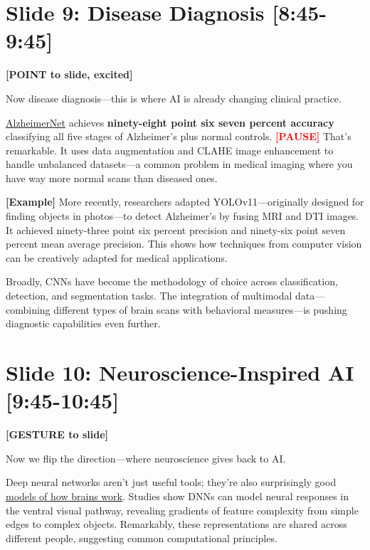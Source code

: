 \documentclass[12pt]{article}
\begin{document}
\hrulefill

\section*{Slide 9: Disease Diagnosis [8:45-9:45]}

\textcolor{DukeBlue}{\textbf{[POINT to slide, excited]}}

Now disease diagnosis—this is where AI is already changing clinical practice.

\ul{AlzheimerNet} achieves \textcolor{DukeBlue}{\textbf{ninety-eight point six seven percent accuracy}} classifying all five stages of Alzheimer's plus normal controls. \textcolor{red}{\textbf{[PAUSE]}} That's remarkable. It uses data augmentation and CLAHE image enhancement to handle unbalanced datasets—a common problem in medical imaging where you have way more normal scans than diseased ones.

\textcolor{green!60!black}{\textbf{[Example]}} More recently, researchers adapted YOLOv11—originally designed for finding objects in photos—to detect Alzheimer's by fusing MRI and DTI images. It achieved ninety-three point six percent precision and ninety-six point seven percent mean average precision. This shows how techniques from computer vision can be creatively adapted for medical applications.

Broadly, CNNs have become the methodology of choice across classification, detection, and segmentation tasks. The integration of multimodal data—combining different types of brain scans with behavioral measures—is pushing diagnostic capabilities even further.

\hrulefill

\section*{Slide 10: Neuroscience-Inspired AI [9:45-10:45]}

\textcolor{DukeBlue}{\textbf{[GESTURE to slide]}}

Now we flip the direction—where neuroscience gives back to AI.

Deep neural networks aren't just useful tools; they're also surprisingly good \ul{models of how brains work}. Studies show DNNs can model neural responses in the ventral visual pathway, revealing gradients of feature complexity from simple edges to complex objects. Remarkably, these representations are shared across different people, suggesting common computational principles.
\end{document}
